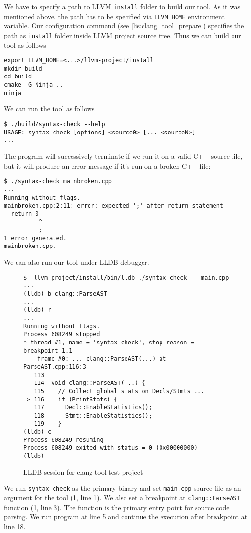 We have to specify a path to LLVM \texttt{install} folder to build our tool. As
it was mentioned above, the path has to be specified via
\texttt{LLVM_HOME} environment variable. Our configuration command
(see \cref{lis:clang_tool_prepare}) specifies the path as \texttt{install}
folder inside LLVM project source tree. Thus we can build our tool as follows
\begin{adjustwidth}{0em}{0em}
\begin{verbatim}
export LLVM_HOME=<...>/llvm-project/install
mkdir build
cd build
cmake -G Ninja ..
ninja
\end{verbatim}
\end{adjustwidth}

We can run the tool as follows
\begin{adjustwidth}{0em}{0em}
\begin{verbatim}
$ ./build/syntax-check --help
USAGE: syntax-check [options] <source0> [... <sourceN>]
...
\end{verbatim}
\end{adjustwidth}

The program will successively terminate if we run it on a valid C++ source file,
but it will produce an error message if it's run on a broken C++ file:
\begin{adjustwidth}{0em}{0em}
\begin{verbatim}
$ ./syntax-check mainbroken.cpp 
...
Running without flags.
mainbroken.cpp:2:11: error: expected ';' after return statement
  return 0
          ^
          ;
1 error generated.
mainbroken.cpp.
\end{verbatim}
\end{adjustwidth}

We can also run our tool under LLDB debugger.
\begin{figure}[H]
\begin{verbatim}
$  llvm-project/install/bin/lldb ./syntax-check -- main.cpp 
...
(lldb) b clang::ParseAST
...
(lldb) r
...
Running without flags.
Process 608249 stopped
* thread #1, name = 'syntax-check', stop reason = breakpoint 1.1
    frame #0: ... clang::ParseAST(...) at ParseAST.cpp:116:3
   113 	
   114 	void clang::ParseAST(...) {
   115 	  // Collect global stats on Decls/Stmts ...
-> 116 	  if (PrintStats) {
   117 	    Decl::EnableStatistics();
   118 	    Stmt::EnableStatistics();
   119 	  }
(lldb) c
Process 608249 resuming
Process 608249 exited with status = 0 (0x00000000) 
(lldb)
\end{verbatim}
\label{lis:lldb_clang_tool}
\caption{LLDB session for clang tool test project}
\end{figure}
We run \texttt{syntax-check} as the primary binary and set \texttt{main.cpp}
source 
file as an argument for the tool (\cref{lis:lldb_clang_tool}, line 1).
We also set a breakpoint at
\texttt{clang::ParseAST} function (\cref{lis:lldb_clang_tool}, line
3). The function is the primary entry point for source code parsing. We run
program at line 5 and continue the execution after breakpoint at line 18.

